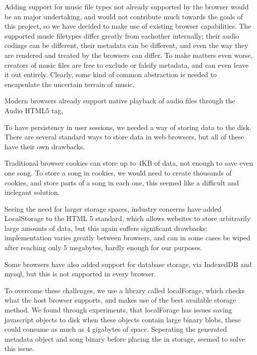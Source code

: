 
Adding support for music file types not already supported by the browser 
would be an major undertaking, 
and would not contribute much towards the goals of this project, 
so we have decided to make use of existing browser capabilities.
The supported music filetypes differ greatly from eachother internally; 
their audio codings can be different, their metadata can be different,
and even the way they are rendered and treated by the browsers can differ.
To make matters even worse, 
creators of music files are free to exclude or falsify metadata, and can even leave it out entirely.
Clearly, some kind of common abstraction is needed to encapsulate the uncertain terrain of music.

Modern browsers already support native playback of audio files through the Audio HTML5 tag, 

To have persistency in user sessions, we needed a way of storing data to the disk. There are several standard ways to store data in web browsers, but all of these have their own drawbacks.

Traditional browser cookies can store up to 4KB of data, 
not enough to save even one song. 
To store a song in cookies, 
we would need to create thousands of cookies, 
and store parts of a song in each one, 
this seemed like a difficult and inelegant solution.

Seeing the need for larger storage spaces, 
industry concerns have added LocalStorage to the HTML 5 standard,
which allows websites to store arbitrarily large amounts of data,
but this again suffers significant drawbacks: 
implementation varies greatly between browsers, 
and can in some cases be wiped after reaching only 5 megabytes, 
hardly enough for our purposes.

Some browsers have also added support for database storage, via IndexedDB and mysql, but this is not supported in every browser.

To overcome these challenges, we use a library called localForage, 
which checks what the host browser supports,
and makes use of the best available storage method.
We found through experiments,
that localForage has issues saving javascript objects to disk when these objects contain large binary blobs, 
these could consume as much as 4 gigabytes of space.
Seperating the generated metadata object and song binary before placing the in storage, 
seemed to solve this issue.

